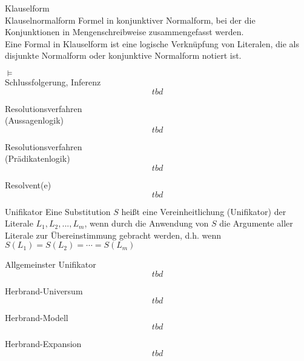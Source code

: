 \documentclass[a7paper,print,grid=both]{kartei}
\begin{document}
\begin{karte}{Klauselform\\Klauselnormalform}
Formel in konjunktiver Normalform, bei der die Konjunktionen in Mengenschreibweise zusammengefasst werden.\\
Eine Formal in Klauselform ist eine logische Verknüpfung von Literalen, die als disjunkte Normalform oder konjunktive Normalform notiert ist.
\end{karte}
\begin{karte}{$\models$\\Schlussfolgerung, Inferenz}
\[tbd\]
\end{karte}
\begin{karte}{Resolutionsverfahren\\(Aussagenlogik)}
\[tbd\]
\end{karte}
\begin{karte}{Resolutionsverfahren\\(Prädikatenlogik)}
\[tbd\]
\end{karte}
\begin{karte}{Resolvent(e)}
\[tbd\]
\end{karte}
\begin{karte}{Unifikator}
Eine Substitution $S$ heißt eine Vereinheitlichung (Unifikator) der Literale $L_1, L_2, ... , L_m$, wenn durch die Anwendung von $S$ die Argumente aller Literale zur Übereinstimmung gebracht werden, d.h. wenn $S(L_1) = S(L_2) = \cdots = S(L_m)$
\end{karte}
\begin{karte}{Allgemeinster Unifikator}
\[tbd\]
\end{karte}
\begin{karte}{Herbrand-Universum}
\[tbd\]
\end{karte}
\begin{karte}{Herbrand-Modell}
\[tbd\]
\end{karte}
\begin{karte}{Herbrand-Expansion}
\[tbd\]
\end{karte}
\end{document}

